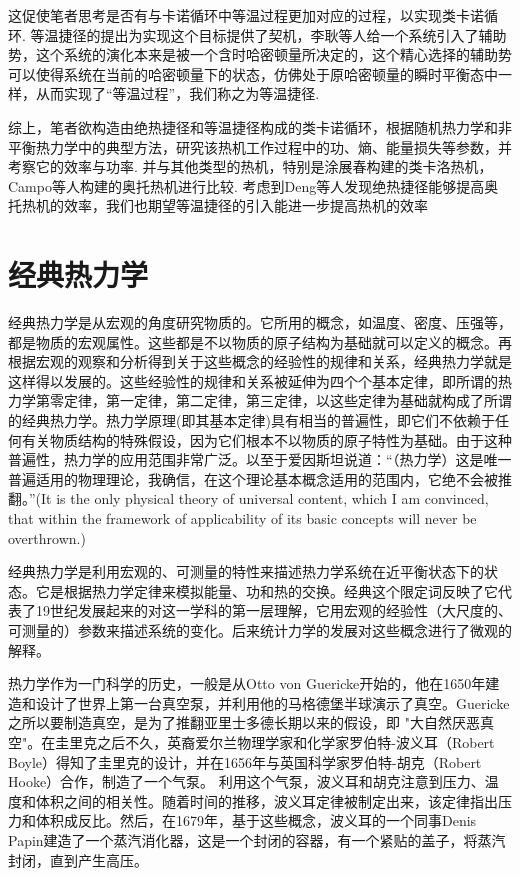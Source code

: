 这促使笔者思考是否有与卡诺循环中等温过程更加对应的过程，以实现类卡诺循环. 等温捷径\cite{Li2016}的提出为实现这个目标提供了契机，李耿等人给一个系统引入了辅助势，这个系统的演化本来是被一个含时哈密顿量所决定的，这个精心选择的辅助势可以使得系统在当前的哈密顿量下的状态，仿佛处于原哈密顿量的瞬时平衡态中一样，从而实现了“等温过程”，我们称之为等温捷径.

综上，笔者欲构造由绝热捷径和等温捷径构成的类卡诺循环，根据随机热力学和非平衡热力学中的典型方法，研究该热机工作过程中的功、熵、能量损失等参数，并考察它的效率与功率. 并与其他类型的热机，特别是涂展春构建的类卡洛热机\cite{Tu2013}，Campo等人构建的奥托热机\cite{DelCampo2014}进行比较. 考虑到Deng等人发现绝热捷径能够提高奥托热机的效率\cite{Deng2013}，我们也期望等温捷径的引入能进一步提高热机的效率


\section{经典热力学}

\quad 经典热力学是从宏观的角度研究物质的。它所用的概念，如温度、密度、压强等，都是物质的宏观属性。这些都是不以物质的原子结构为基础就可以定义的概念。再根据宏观的观察和分析得到关于这些概念的经验性的规律和关系，经典热力学就是这样得以发展的。这些经验性的规律和关系被延伸为四个个基本定律，即所谓的热力学第零定律，第一定律，第二定律，第三定律，以这些定律为基础就构成了所谓的经典热力学。热力学原理(即其基本定律)具有相当的普遍性，即它们不依赖于任何有关物质结构的特殊假设，因为它们根本不以物质的原子特性为基础。由于这种普遍性，热力学的应用范围非常广泛。以至于爱因斯坦说道\cite{schilpp1979albert}：“（热力学）这是唯一普遍适用的物理理论，我确信，在这个理论基本概念适用的范围内，它绝不会被推翻。”(It is the only physical theory of universal
content, which I am convinced, that within the framework
of applicability of its basic concepts will never be
overthrown.)


经典热力学是利用宏观的、可测量的特性来描述热力学系统在近平衡状态下的状态。它是根据热力学定律来模拟能量、功和热的交换。经典这个限定词反映了它代表了19世纪发展起来的对这一学科的第一层理解，它用宏观的经验性（大尺度的、可测量的）参数来描述系统的变化。后来统计力学的发展对这些概念进行了微观的解释。

热力学作为一门科学的历史，一般是从Otto von Guericke开始的，他在1650年建造和设计了世界上第一台真空泵，并利用他的马格德堡半球演示了真空。Guericke之所以要制造真空，是为了推翻亚里士多德长期以来的假设，即 "大自然厌恶真空"。在圭里克之后不久，英裔爱尔兰物理学家和化学家罗伯特-波义耳（Robert Boyle）得知了圭里克的设计，并在1656年与英国科学家罗伯特-胡克（Robert Hooke）合作，制造了一个气泵。 利用这个气泵，波义耳和胡克注意到压力、温度和体积之间的相关性。随着时间的推移，波义耳定律被制定出来，该定律指出压力和体积成反比。然后，在1679年，基于这些概念，波义耳的一个同事Denis Papin建造了一个蒸汽消化器，这是一个封闭的容器，有一个紧贴的盖子，将蒸汽封闭，直到产生高压。

